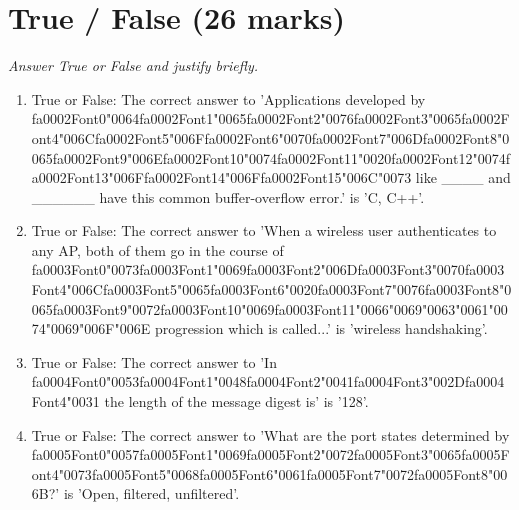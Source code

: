 \documentclass[12pt]{article}
\begin{document}
\section*{True / False (26 marks)}
\textit{Answer True or False and justify briefly.}
\begin{enumerate}[label=\arabic*.]
\item True or False: The correct answer to 'Applications developed by {\csname fa0002Font0\endcsname\char"0064}{\csname fa0002Font1\endcsname\char"0065}{\csname fa0002Font2\endcsname\char"0076}{\csname fa0002Font3\endcsname\char"0065}{\csname fa0002Font4\endcsname\char"006C}{\csname fa0002Font5\endcsname\char"006F}{\csname fa0002Font6\endcsname\char"0070}{\csname fa0002Font7\endcsname\char"006D}{\csname fa0002Font8\endcsname\char"0065}{\csname fa0002Font9\endcsname\char"006E}{\csname fa0002Font10\endcsname\char"0074}{\csname fa0002Font11\endcsname\char"0020}{\csname fa0002Font12\endcsname\char"0074}{\csname fa0002Font13\endcsname\char"006F}{\csname fa0002Font14\endcsname\char"006F}{\csname fa0002Font15\endcsname\char"006C}{\char"0073} like \_\_\_\_ and \_\_\_\_\_\_ have this common buffer-overflow error.' is 'C, C++'.
\item True or False: The correct answer to 'When a wireless user authenticates to any AP, both of them go in the course of {\csname fa0003Font0\endcsname\char"0073}{\csname fa0003Font1\endcsname\char"0069}{\csname fa0003Font2\endcsname\char"006D}{\csname fa0003Font3\endcsname\char"0070}{\csname fa0003Font4\endcsname\char"006C}{\csname fa0003Font5\endcsname\char"0065}{\csname fa0003Font6\endcsname\char"0020}{\csname fa0003Font7\endcsname\char"0076}{\csname fa0003Font8\endcsname\char"0065}{\csname fa0003Font9\endcsname\char"0072}{\csname fa0003Font10\endcsname\char"0069}{\csname fa0003Font11\endcsname\char"0066}{\char"0069}{\char"0063}{\char"0061}{\char"0074}{\char"0069}{\char"006F}{\char"006E} progression which is called...' is 'wireless handshaking'.
\item True or False: The correct answer to 'In {\csname fa0004Font0\endcsname\char"0053}{\csname fa0004Font1\endcsname\char"0048}{\csname fa0004Font2\endcsname\char"0041}{\csname fa0004Font3\endcsname\char"002D}{\csname fa0004Font4\endcsname\char"0031} the length of the message digest is' is '128'.
\item True or False: The correct answer to 'What are the port states determined by {\csname fa0005Font0\endcsname\char"0057}{\csname fa0005Font1\endcsname\char"0069}{\csname fa0005Font2\endcsname\char"0072}{\csname fa0005Font3\endcsname\char"0065}{\csname fa0005Font4\endcsname\char"0073}{\csname fa0005Font5\endcsname\char"0068}{\csname fa0005Font6\endcsname\char"0061}{\csname fa0005Font7\endcsname\char"0072}{\csname fa0005Font8\endcsname\char"006B}?' is 'Open, filtered, unfiltered'.

\end{enumerate}
\end{document}
